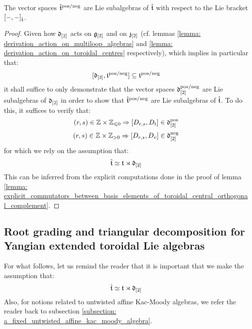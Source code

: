         \begin{lemma} \label{lemma: positive/negative_extended_toroidal_lie_algebras}
            The vector spaces $\hat{\mathfrak{t}}^{\mathrm{pos}/\mathrm{neg}}$ are Lie subalgebras of $\hat{\mathfrak{t}}$ with respect to the Lie bracket $[-, -]_{\hat{\mathfrak{t}}}$.
        \end{lemma}
            \begin{proof}
                Given how $\mathfrak{d}_{[2]}$ acts on $\mathfrak{g}_{[2]}$ and on $\mathfrak{z}_{[2]}$ (cf. lemmas \ref{lemma: derivation_action_on_multiloop_algebras} and \ref{lemma: derivation_action_on_toroidal_centres} respectively), which implies in particular that:
                    $$[\mathfrak{d}_{[2]}, \mathfrak{t}^{\mathrm{pos}/\mathrm{neg}}] \subseteq \mathfrak{t}^{\mathrm{pos}/\mathrm{neg}}$$
                it shall suffice to only demonstrate that the vector spaces $\mathfrak{d}_{[2]}^{\mathrm{pos}/\mathrm{neg}}$ are Lie subalgebras of $\mathfrak{d}_{[2]}$ in order to show that $\hat{\mathfrak{t}}^{\mathrm{pos}/\mathrm{neg}}$ are Lie subalgebras of $\hat{\mathfrak{t}}$. To do this, it suffices to verify that:
                    $$(r, s) \in \Z \x \Z_{\leq 0} \implies [D_{r, s}, D_t] \in \d_{[2]}^{\positive}$$
                    $$(r, s) \in \Z \x \Z_{> 0} \implies [D_{r, s}, D_v] \in \d_{[2]}^{\negative}$$
                for which we rely on the assumption that:
                    $$\hat{\mathfrak{t}} \simeq \mathfrak{t} \rtimes \mathfrak{d}_{[2]}$$
                This can be inferred from the explicit computations done in the proof of lemma \ref{lemma: explicit_commutators_between_basis_elements_of_toroidal_central_orthogonal_complement}.
            \end{proof}

    \subsection{Root grading and triangular decomposition for Yangian extended toroidal Lie algebras}
        For what follows, let us remind the reader that it is important that we make the assumption that:
            $$\hat{\mathfrak{t}} \simeq \mathfrak{t} \rtimes \mathfrak{d}_{[2]}$$
        Also, for notions related to untwisted affine Kac-Moody algebras, we refer the reader back to subsection \ref{subsection: a_fixed_untwisted_affine_kac_moody_algebra}.
            
